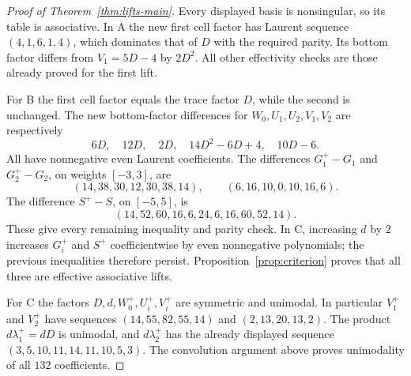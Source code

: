 \begin{proof}[Proof of Theorem~\ref{thm:lifts-main}]
Every displayed basis is nonsingular, so its table is associative. In A the new first cell factor has Laurent sequence $(4,1,6,1,4)$, which dominates that of $D$ with the required parity. Its bottom factor differs from $V_1=5D-4$ by $2D^2$. All other effectivity checks are those already proved for the first lift.

For B the first cell factor equals the trace factor $D$, while the second is unchanged. The new bottom-factor differences for $W_0,U_1,U_2,V_1,V_2$ are respectively
\[
 6D,\quad12D,\quad2D,\quad14D^2-6D+4,\quad10D-6.
\]
All have nonnegative even Laurent coefficients. The differences $G_1^+-G_1$ and $G_2^+-G_2$, on weights $[-3,3]$, are
\[
 (14,38,30,12,30,38,14),\qquad(6,16,10,0,10,16,6).
\]
The difference $S^+-S$, on $[-5,5]$, is
\[
 (14,52,60,16,6,24,6,16,60,52,14).
\]
These give every remaining inequality and parity check. In C, increasing $d$ by $2$ increases $G_i^+$ and $S^+$ coefficientwise by even nonnegative polynomials; the previous inequalities therefore persist. Proposition~\ref{prop:criterion} proves that all three are effective associative lifts.

For C the factors $D,d,W_0^+,U_i^+,V_i^+$ are symmetric and unimodal. In particular $V_1^+$ and $V_2^+$ have sequences $(14,55,82,55,14)$ and $(2,13,20,13,2)$. The product $d\lambda_1^+=dD$ is unimodal, and $d\lambda_2^+$ has the already displayed sequence $(3,5,10,11,14,11,10,5,3)$. The convolution argument above proves unimodality of all $132$ coefficients.


\end{proof}
